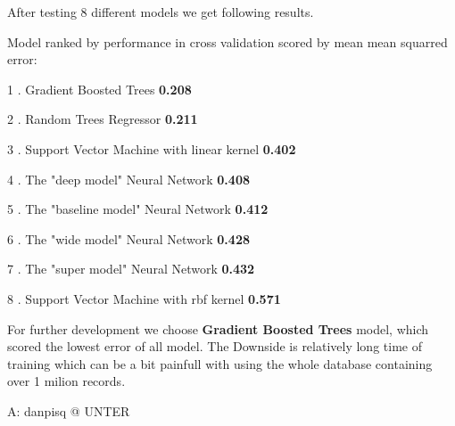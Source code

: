 \documentclass[11pt]{article}
\begin{document}
    After testing 8 different models we get following results.

Model ranked by performance in cross validation scored by mean mean
squarred error:

1 . Gradient Boosted Trees \textbf{0.208}

2 . Random Trees Regressor \textbf{0.211}

3 . Support Vector Machine with linear kernel \textbf{0.402}

4 . The "deep model" Neural Network \textbf{0.408}

5 . The "baseline model" Neural Network \textbf{0.412}

6 . The "wide model" Neural Network \textbf{0.428}

7 . The "super model" Neural Network \textbf{0.432}

8 . Support Vector Machine with rbf kernel \textbf{0.571}

    

    

    For further development we choose \textbf{Gradient Boosted Trees} model,
which scored the lowest error of all model. The Downside is relatively
long time of training which can be a bit painfull with using the whole
database containing over 1 milion records.

    A: danpisq @ UNTER


    
    
    
    
\end{document}
